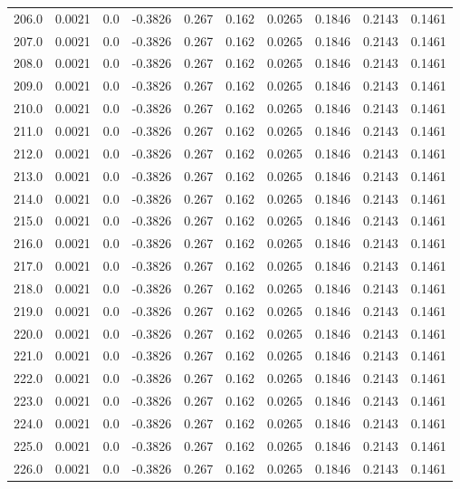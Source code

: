\begin{longtable}{lrrrrrrrrr}
206.0 & 0.0021 & 0.0 & -0.3826 & 0.267 & 0.162 & 0.0265 & 0.1846 & 0.2143 & 0.1461 \\
207.0 & 0.0021 & 0.0 & -0.3826 & 0.267 & 0.162 & 0.0265 & 0.1846 & 0.2143 & 0.1461 \\
208.0 & 0.0021 & 0.0 & -0.3826 & 0.267 & 0.162 & 0.0265 & 0.1846 & 0.2143 & 0.1461 \\
209.0 & 0.0021 & 0.0 & -0.3826 & 0.267 & 0.162 & 0.0265 & 0.1846 & 0.2143 & 0.1461 \\
210.0 & 0.0021 & 0.0 & -0.3826 & 0.267 & 0.162 & 0.0265 & 0.1846 & 0.2143 & 0.1461 \\
211.0 & 0.0021 & 0.0 & -0.3826 & 0.267 & 0.162 & 0.0265 & 0.1846 & 0.2143 & 0.1461 \\
212.0 & 0.0021 & 0.0 & -0.3826 & 0.267 & 0.162 & 0.0265 & 0.1846 & 0.2143 & 0.1461 \\
213.0 & 0.0021 & 0.0 & -0.3826 & 0.267 & 0.162 & 0.0265 & 0.1846 & 0.2143 & 0.1461 \\
214.0 & 0.0021 & 0.0 & -0.3826 & 0.267 & 0.162 & 0.0265 & 0.1846 & 0.2143 & 0.1461 \\
215.0 & 0.0021 & 0.0 & -0.3826 & 0.267 & 0.162 & 0.0265 & 0.1846 & 0.2143 & 0.1461 \\
216.0 & 0.0021 & 0.0 & -0.3826 & 0.267 & 0.162 & 0.0265 & 0.1846 & 0.2143 & 0.1461 \\
217.0 & 0.0021 & 0.0 & -0.3826 & 0.267 & 0.162 & 0.0265 & 0.1846 & 0.2143 & 0.1461 \\
218.0 & 0.0021 & 0.0 & -0.3826 & 0.267 & 0.162 & 0.0265 & 0.1846 & 0.2143 & 0.1461 \\
219.0 & 0.0021 & 0.0 & -0.3826 & 0.267 & 0.162 & 0.0265 & 0.1846 & 0.2143 & 0.1461 \\
220.0 & 0.0021 & 0.0 & -0.3826 & 0.267 & 0.162 & 0.0265 & 0.1846 & 0.2143 & 0.1461 \\
221.0 & 0.0021 & 0.0 & -0.3826 & 0.267 & 0.162 & 0.0265 & 0.1846 & 0.2143 & 0.1461 \\
222.0 & 0.0021 & 0.0 & -0.3826 & 0.267 & 0.162 & 0.0265 & 0.1846 & 0.2143 & 0.1461 \\
223.0 & 0.0021 & 0.0 & -0.3826 & 0.267 & 0.162 & 0.0265 & 0.1846 & 0.2143 & 0.1461 \\
224.0 & 0.0021 & 0.0 & -0.3826 & 0.267 & 0.162 & 0.0265 & 0.1846 & 0.2143 & 0.1461 \\
225.0 & 0.0021 & 0.0 & -0.3826 & 0.267 & 0.162 & 0.0265 & 0.1846 & 0.2143 & 0.1461 \\
226.0 & 0.0021 & 0.0 & -0.3826 & 0.267 & 0.162 & 0.0265 & 0.1846 & 0.2143 & 0.1461 \\

\end{longtable}

